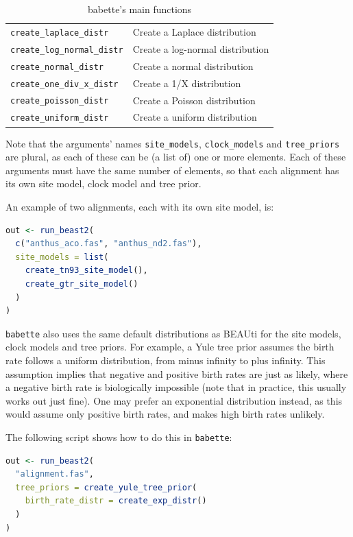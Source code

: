 \documentclass{article}
\begin{document}
\begin{table}[]
\begin{tabular}{ | l | l | }
\verb;create_laplace_distr; & Create a Laplace distribution \\
\verb;create_log_normal_distr; & Create a log-normal distribution \\
\verb;create_normal_distr; & Create a normal distribution \\
\verb;create_one_div_x_distr; & Create a 1/X distribution \\
\verb;create_poisson_distr; & Create a Poisson distribution \\
\verb;create_uniform_distr; & Create a uniform distribution \\
\hline
\end{tabular}
\caption{babette's main functions}
\label{tab:functions}
\end{table}

Note that the arguments' names \verb;site_models;, \verb;clock_models; 
and \verb;tree_priors; are plural, as each of these
can be (a list of) one or more elements. Each of these arguments must 
have the same number of elements, so that each alignment has its
own site model, clock model and tree prior. 

An example of two alignments, each with its own site model, is:

\begin{lstlisting}[language=R, floatplacement=H]
out <- run_beast2(
  c("anthus_aco.fas", "anthus_nd2.fas"),
  site_models = list(
    create_tn93_site_model(), 
    create_gtr_site_model()
  )
)
\end{lstlisting}

\verb;babette; also uses the same default distributions as BEAUti 
for the site models, clock models and tree priors. 
For example, a Yule tree prior assumes the birth rate follows a uniform distribution, 
from minus infinity to plus infinity. 
This assumption implies that negative and positive birth rates are just as likely, 
where a negative birth rate is biologically impossible (note that 
in practice, this usually works out just fine).
One may prefer an exponential distribution instead, 
as this would assume only positive birth rates, 
and makes high birth rates unlikely.

The following script shows how to do this in \verb;babette;:

\begin{lstlisting}[language=R, floatplacement=H]
out <- run_beast2(
  "alignment.fas",
  tree_priors = create_yule_tree_prior(
    birth_rate_distr = create_exp_distr()    
  )
)
\end{lstlisting}
\end{document}
